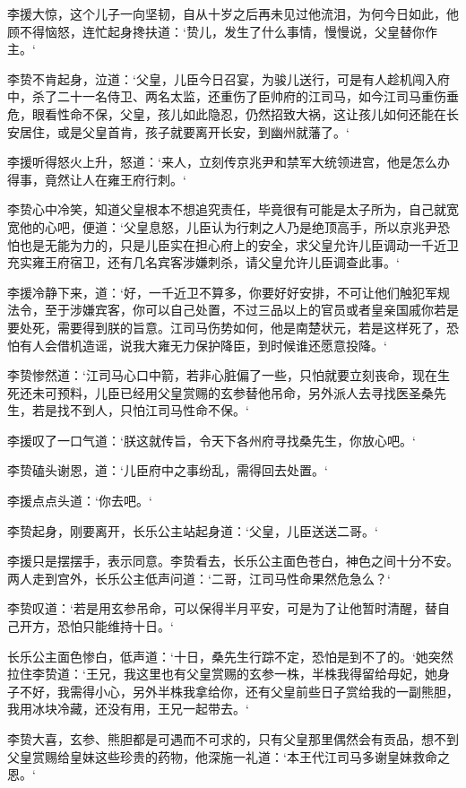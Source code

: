 李援大惊，这个儿子一向坚韧，自从十岁之后再未见过他流泪，为何今日如此，他顾不得恼怒，连忙起身搀扶道：‘贽儿，发生了什么事情，慢慢说，父皇替你作主。‘

李贽不肯起身，泣道：‘父皇，儿臣今日召宴，为骏儿送行，可是有人趁机闯入府中，杀了二十一名侍卫、两名太监，还重伤了臣帅府的江司马，如今江司马重伤垂危，眼看性命不保，父皇，孩儿如此隐忍，仍然招致大祸，这让孩儿如何还能在长安居住，或是父皇首肯，孩子就要离开长安，到幽州就藩了。‘

李援听得怒火上升，怒道：‘来人，立刻传京兆尹和禁军大统领进宫，他是怎么办得事，竟然让人在雍王府行刺。‘

李贽心中冷笑，知道父皇根本不想追究责任，毕竟很有可能是太子所为，自己就宽宽他的心吧，便道：‘父皇息怒，儿臣认为行刺之人乃是绝顶高手，所以京兆尹恐怕也是无能为力的，只是儿臣实在担心府上的安全，求父皇允许儿臣调动一千近卫充实雍王府宿卫，还有几名宾客涉嫌刺杀，请父皇允许儿臣调查此事。‘

李援冷静下来，道：‘好，一千近卫不算多，你要好好安排，不可让他们触犯军规法令，至于涉嫌宾客，你可以自己处置，不过三品以上的官员或者皇亲国戚你若是要处死，需要得到朕的旨意。江司马伤势如何，他是南楚状元，若是这样死了，恐怕有人会借机造谣，说我大雍无力保护降臣，到时候谁还愿意投降。‘

李贽惨然道：‘江司马心口中箭，若非心脏偏了一些，只怕就要立刻丧命，现在生死还未可预料，儿臣已经用父皇赏赐的玄参替他吊命，另外派人去寻找医圣桑先生，若是找不到人，只怕江司马性命不保。‘

李援叹了一口气道：‘朕这就传旨，令天下各州府寻找桑先生，你放心吧。‘

李贽磕头谢恩，道：‘儿臣府中之事纷乱，需得回去处置。‘

李援点点头道：‘你去吧。‘

李贽起身，刚要离开，长乐公主站起身道：‘父皇，儿臣送送二哥。‘

李援只是摆摆手，表示同意。李贽看去，长乐公主面色苍白，神色之间十分不安。两人走到宫外，长乐公主低声问道：‘二哥，江司马性命果然危急么？‘

李贽叹道：‘若是用玄参吊命，可以保得半月平安，可是为了让他暂时清醒，替自己开方，恐怕只能维持十日。‘

长乐公主面色惨白，低声道：‘十日，桑先生行踪不定，恐怕是到不了的。‘她突然拉住李贽道：‘王兄，我这里也有父皇赏赐的玄参一株，半株我得留给母妃，她身子不好，我需得小心，另外半株我拿给你，还有父皇前些日子赏给我的一副熊胆，我用冰块冷藏，还没有用，王兄一起带去。‘

李贽大喜，玄参、熊胆都是可遇而不可求的，只有父皇那里偶然会有贡品，想不到父皇赏赐给皇妹这些珍贵的药物，他深施一礼道：‘本王代江司马多谢皇妹救命之恩。‘

